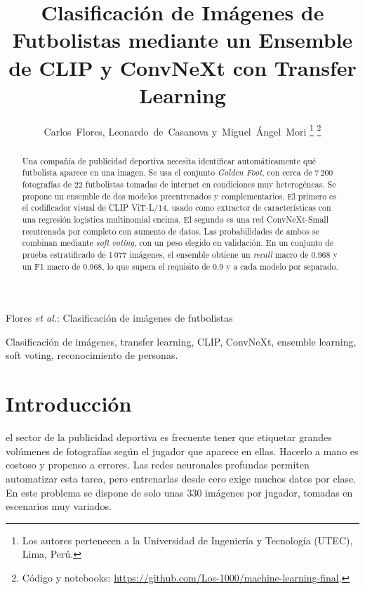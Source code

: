 \documentclass[journal]{IEEEtran}
\begin{document}
\title{Clasificación de Imágenes de Futbolistas mediante un Ensemble de CLIP y ConvNeXt con Transfer Learning}

\author{Carlos~Flores, Leonardo~de~Casanova y~Miguel~Ángel~Mori%
\thanks{Los autores pertenecen a la Universidad de Ingeniería y Tecnología (UTEC), Lima, Perú.}%
\thanks{Código y notebooks: \protect\url{https://github.com/Los-1000/machine-learning-final}.}}

%
{Flores \MakeLowercase{\textit{et al.}}: Clasificación de imágenes de futbolistas}

\maketitle

\begin{abstract}
Una compañía de publicidad deportiva necesita identificar automáticamente qué futbolista aparece en una imagen. Se usa el conjunto \textit{Golden Foot}, con cerca de 7\,200 fotografías de 22 futbolistas tomadas de internet en condiciones muy heterogéneas. Se propone un ensemble de dos modelos preentrenados y complementarios. El primero es el codificador visual de CLIP ViT-L/14, usado como extractor de características con una regresión logística multinomial encima. El segundo es una red ConvNeXt-Small reentrenada por completo con aumento de datos. Las probabilidades de ambos se combinan mediante \textit{soft voting}, con un peso elegido en validación. En un conjunto de prueba estratificado de 1\,077 imágenes, el ensemble obtiene un \textit{recall} macro de 0.968 y un F1 macro de 0.968, lo que supera el requisito de 0.9 y a cada modelo por separado.
\end{abstract}

\begin{IEEEkeywords}
Clasificación de imágenes, transfer learning, CLIP, ConvNeXt, ensemble learning, soft voting, reconocimiento de personas.
\end{IEEEkeywords}

\section{Introducción}
 el sector de la publicidad deportiva es frecuente tener que etiquetar grandes volúmenes de fotografías según el jugador que aparece en ellas. Hacerlo a mano es costoso y propenso a errores. Las redes neuronales profundas permiten automatizar esta tarea, pero entrenarlas desde cero exige muchos datos por clase. En este problema se dispone de solo unas 330 imágenes por jugador, tomadas en escenarios muy variados.
\end{document}

